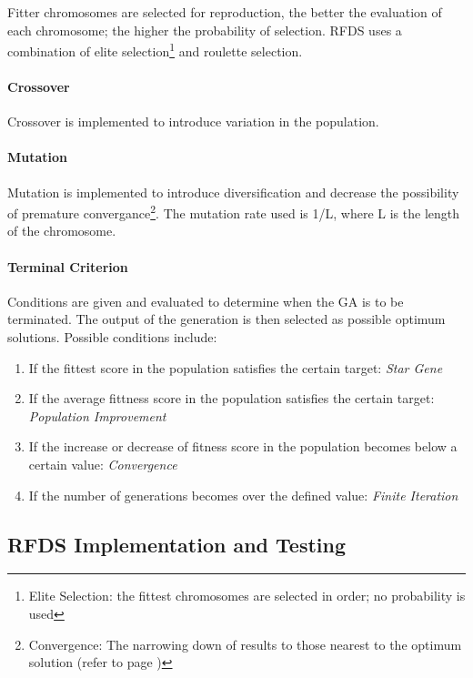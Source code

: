 Fitter chromosomes are selected for reproduction, the better the evaluation of each chromosome; the higher the probability of selection. RFDS uses a combination of elite selection\footnote{Elite Selection: the fittest chromosomes are selected in order; no probability is used} and roulette selection.

\paragraph{Crossover}\mbox{}

Crossover is implemented to introduce variation in the population.

\paragraph{Mutation}\mbox{}

Mutation is implemented to introduce diversification and decrease the possibility of premature convergance\footnote{Convergence: The narrowing down of results to those nearest to the optimum solution (refer to page \pageref{sec:GAConvergence})}. The mutation rate used is 1/L, where L is the length of the chromosome.

\paragraph{Terminal Criterion}\mbox{}

Conditions are given and evaluated to determine when the GA is to be terminated. The output of the generation is then selected as possible optimum solutions. Possible conditions include:

\begin{enumerate}
\item If the fittest score in the population satisfies the certain target: \emph{Star Gene}
\item If the average fittness score in the population satisfies the certain target: \emph{Population Improvement}
\item If the increase or decrease of fitness score in the population becomes below a certain value: \emph{Convergence}
\item If the number of generations becomes over the defined value: \emph{Finite Iteration} 
\end{enumerate}

\subsection{RFDS Implementation and Testing}

